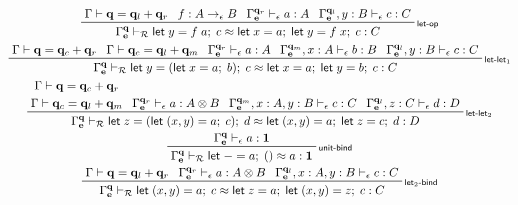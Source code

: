 \documentclass[acmsmall,screen,review]{acmart}
\newcommand{\mc}[1]{\ensuremath{\mathcal{#1}}}
\newcommand{\mb}[1]{\ensuremath{\mathbf{#1}}}
\newcommand{\ms}[1]{\ensuremath{\mathsf{#1}}}
\newcommand{\letexpr}[3]{\ensuremath{\ms{let}\;#1 = #2;\;#3}}
\newcommand{\qsp}[4]{#1 \vdash #2 = #3 + #4}
\newcommand{\rle}[1]{{\scriptsize\textsf{#1}}}
\newcommand{\hasty}[4]{#1 \vdash_{#2} #3: {#4}}
\newcommand{\teqv}{\approx}
\newcommand{\tmeq}[5]{#1 \vdash_{#2} #3 \teqv #4 : {#5}}
\begin{document}
\begin{gather*}
  \prftree[r]{\rle{let-op}}
    {\qsp{\Gamma}{\mb{q}}{\mb{q}_l}{\mb{q}_r}}
    {f : A \to_\epsilon B}
    {\hasty{\Gamma^{\mb{q}_r}_{\mb{e}}}{\epsilon}{a}{A}}
    {\hasty{\Gamma^{\mb{q}_l}_{\mb{e}}, y : B}{\epsilon}{c}{C}}
    {\tmeq{\Gamma^{\mb{q}}_{\mb{e}}}{\mc{R}}
      {\letexpr{y}{f\;a}{c}}
      {\letexpr{x}{a}{\letexpr{y}{f\;x}{c}}}
      {C}}
    \\
  \prftree[r]{\rle{let-let$_1$}}
    {\qsp{\Gamma}{\mb{q}}{\mb{q}_c}{\mb{q}_r}}
    {\qsp{\Gamma}{\mb{q}_c}{\mb{q}_l}{\mb{q}_m}}
    {\hasty{\Gamma^{\mb{q}_r}_{\mb{e}}}{\epsilon}{a}{A}}
    {\hasty{\Gamma^{\mb{q}_m}_{\mb{e}}, x : A}{\epsilon}{b}{B}}
    {\hasty{\Gamma^{\mb{q}_l}_{\mb{e}}, y : B}{\epsilon}{c}{C}}
    {
      \tmeq{\Gamma^{\mb{q}}_{\mb{e}}}{\mc{R}}
        {\letexpr{y}{(\letexpr{x}{a}{b})}{c}}
        {\letexpr{x}{a}{\letexpr{y}{b}{c}}}
        {C}
    }
    \\
  \prftree[r]{\rle{let-let$_2$}}
    {
      \prfStackPremises
      {\qsp{\Gamma}{\mb{q}}{\mb{q}_c}{\mb{q}_r}}
      {\qsp{\Gamma}{\mb{q}_c}{\mb{q}_l}{\mb{q}_m}}
    }
    {\hasty{\Gamma^{\mb{q}_r}_{\mb{e}}}{\epsilon}{a}{A \otimes B}}
    {\hasty{\Gamma^{\mb{q}_m}_{\mb{e}}, x : A, y : B}{\epsilon}{c}{C}}
    {\hasty{\Gamma^{\mb{q}_l}_{\mb{e}}, z : C}{\epsilon}{d}{D}}
    {
      \tmeq{\Gamma^{\mb{q}}_{\mb{e}}}{\mc{R}}
        {\letexpr{z}{(\letexpr{(x, y)}{a}{c})}{d}}
        {\letexpr{(x, y)}{a}{\letexpr{z}{c}{d}}}
        {D}
    }
    \\
  \prftree[r]{\rle{unit-bind}}
    {\hasty{\Gamma^{\mb{q}}_{\mb{e}}}{\epsilon}{a}{\mb{1}}}
    {\tmeq{\Gamma^{\mb{q}}_{\mb{e}}}{\mc{R}}{\letexpr{-}{a}{()}}{a}{\mb{1}}}
    \\
  \prftree[r]{\rle{let$_2$-bind}}
    {\qsp{\Gamma}{\mb{q}}{\mb{q}_l}{\mb{q}_r}}
    {\hasty{\Gamma^{\mb{q}_r}_{\mb{e}}}{\epsilon}{a}{A \otimes B}}
    {\hasty{\Gamma^{\mb{q}_l}_{\mb{e}}, x : A, y : B}{\epsilon}{c}{C}}
    {
      \tmeq{\Gamma^{\mb{q}}_{\mb{e}}}{\mc{R}}
        {\letexpr{(x, y)}{a}{c}}
        {\letexpr{z}{a}{\letexpr{(x, y)}{z}{c}}}
        {C}
    }
\end{gather*}
\end{document}
